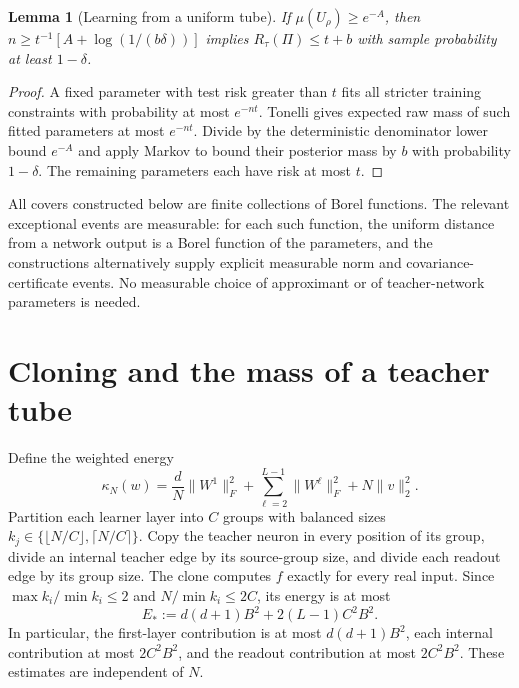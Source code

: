 \documentclass[11pt]{article}
\newtheorem{lemma}[theorem]{Lemma}\newtheorem{corollary}[theorem]{Corollary}
\theoremstyle{remark}\newtheorem{remark}[theorem]{Remark}
\begin{document}
\begin{lemma}[Learning from a uniform tube]\label{lem:mass-posterior}
If $\mu(U_\rho)\geq e^{-A}$, then
$n\geq t^{-1}[A+\log(1/(b\delta))]$ implies
$R_\tau(\Pi)\leq t+b$ with sample probability at least $1-\delta$.
\end{lemma}
\begin{proof}
A fixed parameter with test risk greater than $t$ fits all stricter
training constraints with probability at most $e^{-nt}$. Tonelli gives
expected raw mass of such fitted parameters at most $e^{-nt}$.
Divide by the deterministic denominator lower bound $e^{-A}$ and apply
Markov to bound their posterior mass by $b$ with probability $1-\delta$.
The remaining parameters each have risk at most $t$.
\end{proof}

All covers constructed below are finite collections of Borel functions.
The relevant exceptional events are measurable: for each such function,
the uniform distance from a network output is a Borel function of the
parameters, and the constructions alternatively supply explicit measurable
norm and covariance-certificate events. No measurable choice of approximant
or of teacher-network parameters is needed.

\section{Cloning and the mass of a teacher tube}\label{sec:mass}
Define the weighted energy
\begin{equation}\label{eq:energy}
 \kappa_N(w)=\frac dN\|W^1\|_F^2+
       \sum_{\ell=2}^{L-1}\|W^\ell\|_F^2+N\|v\|_2^2.
\end{equation}
Partition each learner layer into $C$ groups with balanced sizes
$k_j\in\{\lfloor N/C\rfloor,\lceil N/C\rceil\}$. Copy the
teacher neuron in every position of its group, divide an internal teacher
edge by its source-group size, and divide each readout edge by its group
size. The clone computes $f$ exactly for every real input. Since
$\max k_i/\min k_i\leq2$ and $N/\min k_i\leq2C$, its energy is at most
\begin{equation}\label{eq:teacher-energy}
 E_*:=d(d+1)B^2+2(L-1)C^2B^2.
\end{equation}
In particular, the first-layer contribution is at most $d(d+1)B^2$,
each internal contribution at most $2C^2B^2$, and the readout contribution
at most $2C^2B^2$. These estimates are independent of $N$.
\end{document}
